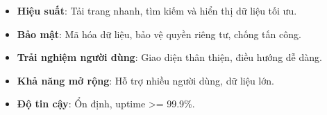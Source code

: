 

\begin{itemize}
    \renewcommand{\labelitemi}{-}
    \item \textbf{Hiệu suất}: Tải trang nhanh, tìm kiếm và hiển thị dữ liệu tối ưu.
    \item \textbf{Bảo mật}: Mã hóa dữ liệu, bảo vệ quyền riêng tư, chống tấn công.
    \item \textbf{Trải nghiệm người dùng}: Giao diện thân thiện, điều hướng dễ dàng.
    \item \textbf{Khả năng mở rộng}: Hỗ trợ nhiều người dùng, dữ liệu lớn.
    \item \textbf{Độ tin cậy}: Ổn định, uptime >= 99.9\%.
\end{itemize}
